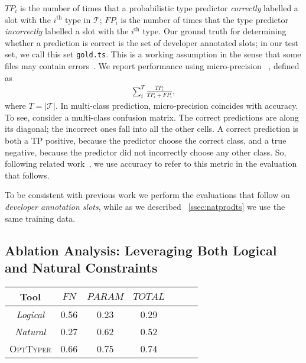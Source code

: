 \documentclass[acmsmall, review, anonymous]{acmart}\settopmatter{printfolios=true,printccs=false,printacmref=false}
\newcommand{\projectname}{\textsc{OptTyper}\xspace}
\begin{document}
$\mathit{TP_i}$ is the number of times that a probabilistic type predictor \emph{correctly} labelled a slot with the $i^\text{th}$ type in $\mathcal{T}$;  $\mathit{FP_i}$ is the number of times that the type predictor \emph{incorrectly} labelled a slot with the $i^\text{th}$ type.  Our ground truth for determining whether a prediction is correct is the set of developer annotated slots; in our test set, we call this set \texttt{gold.ts}. 
This is a working assumption in the sense that some files may contain errors~\citet{williams17}.
We report performance using micro-precision ~\cite{manning}, defined as 
%
\begin{align}\label{eq:acc}
    \sum_i^T \frac{\mathit{TP_i}}{\mathit{TP_i} + \mathit{FP_i}},
\end{align}
%
where $T=|\mathcal{T}|$. In multi-class prediction, micro-precision coincides with accuracy.  To see, consider a multi-class confusion matrix.  The correct predictions are along its diagonal; the incorrect ones fall into all the other cells.  A correct prediction is both a TP positive, because the predictor choose the correct class, and a true negative, because the predictor did not incorrectly choose any other class.  
So, following related work~\cite{wei20}, we use accuracy to refer to this metric in the evaluation that follows.

To be consistent with previous work \citep{hellendoorn18,wei20} we perform the evaluations that follow on \textit{developer annotation slots}, while as we described
~\cref{ssec:natprodts} we use the same training data.

\subsection{Ablation Analysis:  Leveraging Both Logical and Natural Constraints}


\begin{table*}[t]
	\centering
	\caption{Ablation analysis of \projectname, the cells report accuracy; FN refers to return types of functions and PARAM
	represents parameters.}
\label{tab:typeacc1}
	\begin{tabular}{ccccccc}
		\toprule
		Tool  & $\textit{FN}$ & 
		$\textit{PARAM}$ & $\textit{TOTAL}$ \\
		
		\midrule
		\textit{Logical}      & 0.56                                   & 0.23                                 & 0.29                                  \\
		\textit{Natural}      & 0.27                                    & 0.62                                 & 0.52                                   \\
		\projectname  & 0.66         & 0.75         & 0.74\\
		\bottomrule
	\end{tabular}
\end{table*}
\end{document}
